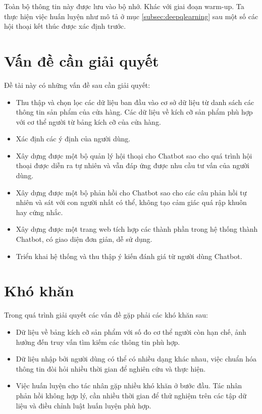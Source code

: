 Toàn bộ thông tin này được lưu vào bộ nhớ. Khác với giai đoạn warm-up. Ta thực hiện việc huấn luyện như mô tả ở mục \ref{subsec:deepqlearning} sau một số các hội thoại kết thúc được xác định trước.

\section{Vấn đề cần giải quyết}
Đề tài này có những vấn đề sau cần giải quyết:

\begin{itemize}
    \item Thu thập và chọn lọc các dữ liệu ban đầu vào cơ sở dữ liệu từ danh sách các thông tin sản phẩm của cửa hàng. Các dữ liệu về kích cỡ sản phẩm phù hợp với cơ thể người từ bảng kích cỡ của cửa hàng.
    \item Xác định các ý định của người dùng.
    \item Xây dựng được một bộ quản lý hội thoại cho Chatbot sao cho quá trình hội thoại được diễn ra tự nhiên và vẫn đáp ứng được nhu cầu tư vấn của người dùng.
    \item Xây dựng được một bộ phản hồi cho Chatbot sao cho các câu phản hồi tự nhiên và sát với con người nhất có thể, không tạo cảm giác quá rập khuôn hay cứng nhắc.
    \item Xây dựng được một trang web tích hợp các thành phần trong hệ thống thành Chatbot, có giao diện đơn giản, dễ sử dụng.
    \item Triển khai hệ thống và thu thập ý kiến đánh giá từ người dùng Chatbot.
\end{itemize}

\section{Khó khăn}
Trong quá trình giải quyết các vấn đề gặp phải các khó khăn sau:

\begin{itemize}
    \item Dữ liệu về bảng kích cỡ sản phẩm với số đo cơ thể người còn hạn chế, ảnh hưởng đến truy vấn tìm kiếm các thông tin phù hợp.
    \item Dữ liệu nhập bởi người dùng có thể có nhiều dạng khác nhau, việc chuẩn hóa thông tin đòi hỏi nhiều thời gian để nghiên cứu và thực hiện.
    \item Việc huấn luyện cho tác nhân gặp nhiều khó khăn ở bước đầu. Tác nhân phản hồi không hợp lý, cần nhiều thời gian để thử nghiệm trên các tập dữ liệu và điều chỉnh luật huấn luyện phù hợp.
\end{itemize}

